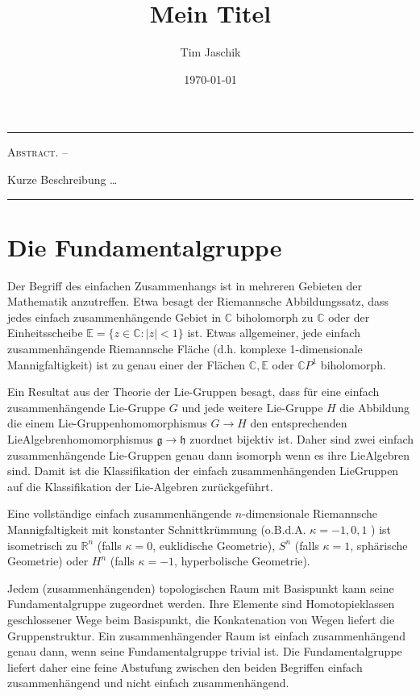 \documentclass[10pt, letterpaper]{article}
\title{Mein Titel}
\author{Tim Jaschik}
\date{\today}
\renewenvironment{abstract}
  {
    \begin{adjustwidth}{1.5cm}{1.5cm}
    \small
    \textsc{Abstract. –}%
  }
  {
    \end{adjustwidth}
  }
\begin{document}
\maketitle
\rule{\textwidth}{0.5pt}
\begin{abstract}
Kurze Beschreibung …
\end{abstract}
\rule{\textwidth}{0.5pt}
\vspace{0.5cm}

\tableofcontents

\pagebreak

\section{Die Fundamentalgruppe}

Der Begriff des einfachen Zusammenhangs ist in mehreren Gebieten der Mathematik anzutreffen. Etwa besagt der Riemannsche Abbildungssatz, dass jedes einfach zusammenhängende Gebiet in $\mathbb{C}$ biholomorph zu $\mathbb{C}$ oder der Einheitsscheibe $\mathbb{E}=\{z \in \mathbb{C}:|z|<1\}$ ist. Etwas allgemeiner, jede einfach zusammenhängende Riemannsche Fläche (d.h. komplexe 1-dimensionale Mannigfaltigkeit) ist zu genau einer der Flächen $\mathbb{C}, \mathbb{E}$ oder $\mathbb{C} P^{1}$ biholomorph.

Ein Resultat aus der Theorie der Lie-Gruppen besagt, dass für eine einfach zusammenhängende Lie-Gruppe $G$ und jede weitere Lie-Gruppe $H$ die Abbildung die einem Lie-Gruppenhomomorphismus $G \rightarrow H$ den entsprechenden LieAlgebrenhomomorphismus $\mathfrak{g} \rightarrow \mathfrak{h}$ zuordnet bijektiv ist. Daher sind zwei einfach zusammenhängende Lie-Gruppen genau dann isomorph wenn es ihre LieAlgebren sind. Damit ist die Klassifikation der einfach zusammenhängenden LieGruppen auf die Klassifikation der Lie-Algebren zurückgeführt.

Eine vollständige einfach zusammenhängende $n$-dimensionale Riemannsche Mannigfaltigkeit mit konstanter Schnittkrümmung (o.B.d.A. $\kappa=-1,0,1$ ) ist isometrisch zu $\mathbb{R}^{n}$ (falls $\kappa=0$, euklidische Geometrie), $S^{n}$ (falls $\kappa=1$, sphärische Geometrie) oder $H^{n}$ (falls $\kappa=-1$, hyperbolische Geometrie).

Jedem (zusammenhängenden) topologischen Raum mit Basispunkt kann seine Fundamentalgruppe zugeordnet werden. Ihre Elemente sind Homotopieklassen geschlossener Wege beim Basispunkt, die Konkatenation von Wegen liefert die Gruppenstruktur. Ein zusammenhängender Raum ist einfach zusammenhängend genau dann, wenn seine Fundamentalgruppe trivial ist. Die Fundamentalgruppe liefert daher eine feine Abstufung zwischen den beiden Begriffen einfach zusammenhängend und nicht einfach zusammenhängend.
\end{document}
